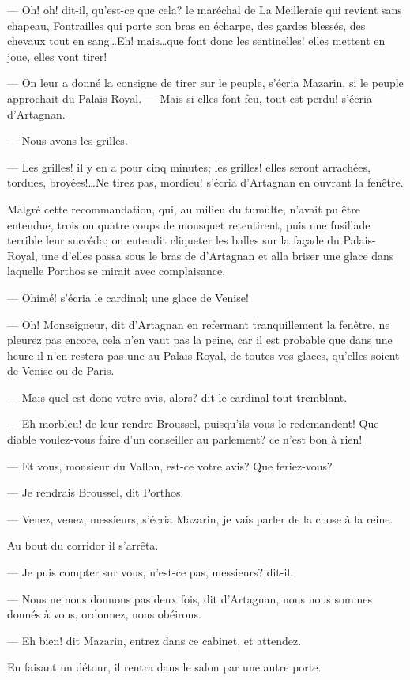— Oh! oh! dit-il, qu'est-ce que cela? le maréchal de La Meilleraie qui revient sans chapeau, Fontrailles qui porte son bras en écharpe, des gardes blessés, des chevaux tout en sang\dots Eh! mais\dots que font donc les sentinelles! elles mettent en joue, elles vont tirer!

— On leur a donné la consigne de tirer sur le peuple, s'écria Mazarin, si le peuple approchait du Palais-Royal.
— Mais si elles font feu, tout est perdu! s'écria d'Artagnan.

— Nous avons les grilles.

— Les grilles! il y en a pour cinq minutes; les grilles! elles seront arrachées, tordues, broyées!\dots Ne tirez pas, mordieu! s'écria d'Artagnan en ouvrant la fenêtre.

Malgré cette recommandation, qui, au milieu du tumulte, n'avait pu être entendue, trois ou quatre coups de mousquet retentirent, puis une fusillade terrible leur succéda; on entendit cliqueter les balles sur la façade du Palais-Royal, une d'elles passa sous le bras de d'Artagnan et alla briser une glace dans laquelle Porthos se mirait avec complaisance.

— Ohimé! s'écria le cardinal; une glace de Venise!

— Oh! Monseigneur, dit d'Artagnan en refermant tranquillement la fenêtre, ne pleurez pas encore, cela n'en vaut pas la peine, car il est probable que dans une heure il n'en restera pas une au Palais-Royal, de toutes vos glaces, qu'elles soient de Venise ou de Paris.

— Mais quel est donc votre avis, alors? dit le cardinal tout tremblant.

— Eh morbleu! de leur rendre Broussel, puisqu'ils vous le redemandent! Que diable voulez-vous faire d'un conseiller au parlement? ce n'est bon à rien!

— Et vous, monsieur du Vallon, est-ce votre avis? Que feriez-vous?

— Je rendrais Broussel, dit Porthos.

— Venez, venez, messieurs, s'écria Mazarin, je vais parler de la chose à la reine.

Au bout du corridor il s'arrêta.

— Je puis compter sur vous, n'est-ce pas, messieurs? dit-il.

— Nous ne nous donnons pas deux fois, dit d'Artagnan, nous nous sommes donnés à vous, ordonnez, nous obéirons.

— Eh bien! dit Mazarin, entrez dans ce cabinet, et attendez.

En faisant un détour, il rentra dans le salon par une autre porte.